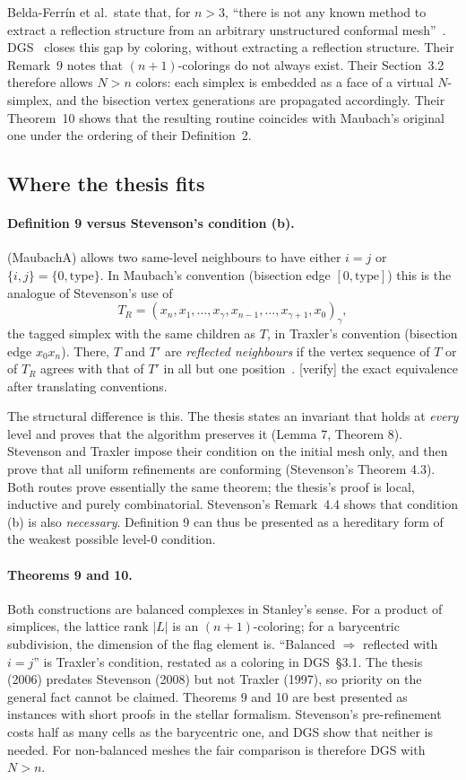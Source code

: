 \documentclass[11pt]{article}
\newcommand{\type}{\mathrm{type}}
\newcommand{\verify}{\textcolor{red!70!black}{\textsf{[verify]}}}
\begin{document}
Belda-Ferrín et al.\ state that, for $n>3$, ``there is not any known method to
extract a reflection structure from an arbitrary unstructured conformal
mesh''~\cite{belda2023}. DGS~\cite{dgs2025} closes this gap by coloring,
without extracting a reflection structure. Their Remark~9 notes that $(n{+}1)$-colorings do not always
exist. Their Section~3.2 therefore allows $N>n$ colors: each simplex is
embedded as a face of a virtual $N$-simplex, and the bisection vertex
generations are propagated accordingly. Their Theorem~10 shows that the
resulting routine coincides with Maubach's original one under the ordering
of their Definition~2.

\subsection{Where the thesis fits}

\paragraph{Definition 9 versus Stevenson's condition (b).}
(MaubachA) allows two same-level neighbours to have either $i=j$ or
$\{i,j\}=\{0,\type\}$. In Maubach's convention (bisection edge $[0,\type]$)
this is the analogue of Stevenson's use of
\[
T_R=(x_n,x_1,\dots,x_\gamma,x_{n-1},\dots,x_{\gamma+1},x_0)_\gamma ,
\]
the tagged simplex with the same children as $T$, in Traxler's convention
(bisection edge $x_0x_n$). There, $T$ and $T'$ are \emph{reflected
neighbours} if the vertex sequence of $T$ or of $T_R$ agrees with that of
$T'$ in all but one position~\cite[\S4]{stevenson2008}.
\verify{} the exact equivalence after translating conventions.

The structural difference is this. The thesis states an invariant that holds
at \emph{every} level and proves that the algorithm preserves it (Lemma 7,
Theorem 8). Stevenson and Traxler impose their condition on the initial mesh
only, and then prove that all uniform refinements are conforming (Stevenson's
Theorem 4.3). Both routes prove essentially the same theorem; the thesis's
proof is local, inductive and purely combinatorial. Stevenson's Remark~4.4
shows that condition (b) is also \emph{necessary}. Definition 9 can thus be
presented as a hereditary form of the weakest possible level-0 condition.

\paragraph{Theorems 9 and 10.}
Both constructions are balanced complexes in Stanley's sense. For a product
of simplices, the lattice rank $|L|$ is an $(n{+}1)$-coloring; for a
barycentric subdivision, the dimension of the flag element is. ``Balanced
$\Rightarrow$ reflected with $i=j$'' is Traxler's condition, restated as a
coloring in DGS~\S3.1. The thesis (2006) predates Stevenson (2008) but not
Traxler (1997), so priority on the general fact cannot be claimed.
Theorems 9 and 10 are best presented as instances with short proofs in the
stellar formalism. Stevenson's pre-refinement costs half as many cells as
the barycentric one, and DGS show that neither is needed. For non-balanced
meshes the fair comparison is therefore DGS with $N>n$.
\end{document}
